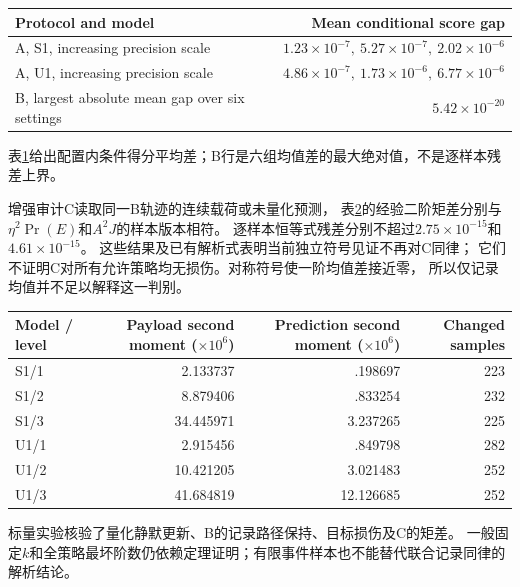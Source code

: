 \begin{table}[ht]
\centering\footnotesize
{}
\label{tab:e1-probability}
\begin{tabular}{lr}
\toprule
Protocol and model & Mean conditional score gap\\
\midrule
A, S1, increasing precision scale & $1.23\times10^{-7},\ 5.27\times10^{-7},\ 2.02\times10^{-6}$\\
A, U1, increasing precision scale & $4.86\times10^{-7},\ 1.73\times10^{-6},\ 6.77\times10^{-6}$\\
B, largest absolute mean gap over six settings & $5.42\times10^{-20}$\\
\bottomrule
\end{tabular}
\end{table}

表\ref{tab:e1-probability}给出配置内条件得分平均差；B行是六组均值差的最大绝对值，不是逐样本残差上界。

增强审计C读取同一B轨迹的连续载荷或未量化预测，
表\ref{tab:e1-c}的经验二阶矩差分别与$\eta^2\Pr(E)$和$A^2J$的样本版本相符。
逐样本恒等式残差分别不超过$2.75\times10^{-15}$和$4.61\times10^{-15}$。
这些结果及已有解析式表明当前独立符号见证不再对C同律；
它们不证明C对所有允许策略均无损伤。对称符号使一阶均值差接近零，
所以仅记录均值并不足以解释这一判别。

\begin{table}[ht]
\centering\footnotesize
{}
\label{tab:e1-c}
\begin{tabular}{lrrr}
\toprule
Model / level & Payload second moment ($\times10^6$) & Prediction second moment ($\times10^6$) & Changed samples\\
\midrule
S1/1 & 2.133737 & .198697 & 223\\
S1/2 & 8.879406 & .833254 & 232\\
S1/3 & 34.445971 & 3.237265 & 225\\
U1/1 & 2.915456 & .849798 & 282\\
U1/2 & 10.421205 & 3.021483 & 252\\
U1/3 & 41.684819 & 12.126685 & 252\\
\bottomrule
\end{tabular}
\end{table}

标量实验核验了量化静默更新、B的记录路径保持、目标损伤及C的矩差。
一般固定$k$和全策略最坏阶数仍依赖定理证明；有限事件样本也不能替代联合记录同律的解析结论。

